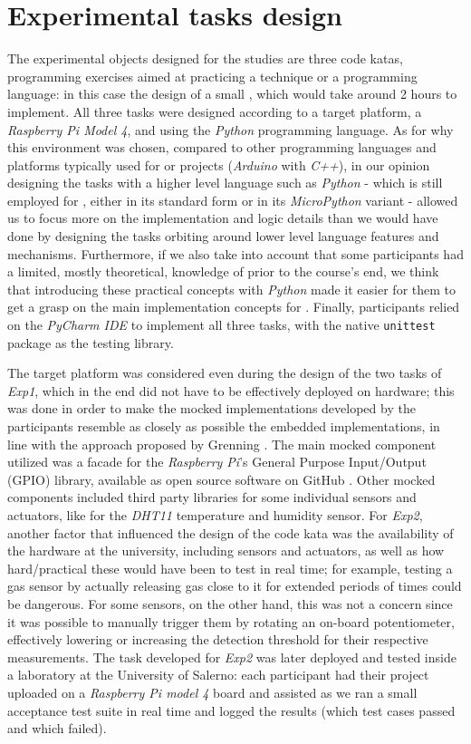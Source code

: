 \section{Experimental tasks design}
The experimental objects designed for the studies are three code katas, \ie programming exercises aimed at practicing a technique or a programming language: in this case the design of a small \es, which would take around 2 hours to implement. 
All three tasks were designed according to a target platform, a \textit{Raspberry Pi Model 4}, and using the \textit{Python} programming language. As for why this environment was chosen, compared to other programming languages and platforms typically used for \ess or \iot projects (\eg \textit{Arduino} with \textit{C++}), in our opinion designing the tasks with a higher level language such as \textit{Python} - which is still employed for \ess, either in its standard form or in its \textit{MicroPython} variant - allowed us to focus more on the implementation and logic details than we would have done by designing the tasks orbiting around lower level language features and mechanisms.
Furthermore, if we also take into account that some participants had a limited, mostly theoretical, knowledge of \ess prior to the course's end, we think that introducing these practical concepts with \textit{Python} made it easier for them to get a grasp on the main implementation concepts for \ess. Finally, participants relied on the \textit{PyCharm IDE} to implement all three tasks, with the native \texttt{unittest} package as the testing library.

The target platform was considered even during the design of the two tasks of \textit{Exp1}, which in the end did not have to be effectively deployed on hardware; this was done in order to make the mocked implementations developed by the participants resemble as closely as possible the embedded implementations, in line with the approach proposed by Grenning \cite{TDDEC}. The main mocked component utilized was a facade for the \textit{Raspberry Pi}'s General Purpose Input/Output (GPIO) library, available as open source software on GitHub \cite{GPIOMock}. Other mocked components included third party libraries for some individual sensors and actuators, like for the \textit{DHT11} temperature and humidity sensor.
For \textit{Exp2}, another factor that influenced the design of the code kata was the availability of the hardware at the university, including sensors and actuators, as well as how hard/practical these would have been to test in real time; for example, testing a gas sensor by actually releasing gas close to it for extended periods of times could be dangerous. For some sensors, on the other hand, this was not a concern since it was possible to manually trigger them by rotating an on-board potentiometer, effectively lowering or increasing the detection threshold for their respective measurements.
The task developed for \textit{Exp2} was later deployed and tested inside a laboratory at the University of Salerno: each participant had their project uploaded on a \textit{Raspberry Pi model 4} board and assisted as we ran a small acceptance test suite in real time and logged the results (\ie which test cases passed and which failed). 


